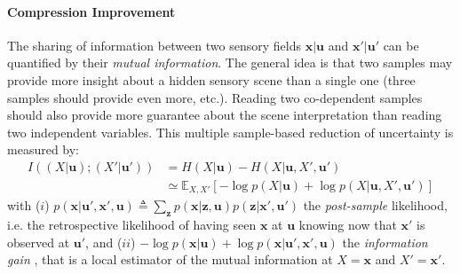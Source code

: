 \documentclass[12pt,twoside,openright]{article}
\begin{document}
\paragraph{Compression Improvement}
The sharing of information between two sensory fields $\boldsymbol{x}|\boldsymbol{u}$ and $\boldsymbol{x}'|\boldsymbol{u}'$  can be quantified by their \emph{mutual information}. The general idea is that two samples may provide more insight about a hidden sensory scene than a single one (three samples should provide even more, etc.). Reading two co-dependent samples should also provide more guarantee about the scene interpretation than reading two independent variables.  This multiple sample-based reduction of uncertainty is measured by:
\begin{align}
I((X| \boldsymbol{u}); (X'| \boldsymbol{u}')) &= H(X| \boldsymbol{u}) - H(X| \boldsymbol{u}, X', \boldsymbol{u}')\label{eq:info-gain}\\
&\simeq \mathbb{E}_{X,X'} \left[-\log p(X| \boldsymbol{u}) + \log p(X| \boldsymbol{u}, X', \boldsymbol{u}')\right] 
\end{align}
with 
($i$) $ p(\boldsymbol{x}| \boldsymbol{u}', \boldsymbol{x}', \boldsymbol{u}) \triangleq \sum_{\boldsymbol{z}} p(\boldsymbol{x}|\boldsymbol{z}, \boldsymbol{u}) p(\boldsymbol{z}|\boldsymbol{x}', \boldsymbol{u}')$ 
the \emph{post-sample} likelihood, i.e. the retrospective likelihood of having seen $\boldsymbol{x}$ at $\boldsymbol{u}$ knowing now that $\boldsymbol{x}'$ is observed at $\boldsymbol{u}'$,
and ($ii$) 
$-\log p(\boldsymbol{x}| \boldsymbol{u}) + \log p(\boldsymbol{x}| \boldsymbol{u}', \boldsymbol{x}', \boldsymbol{u})$ the 
\emph{information gain} \cite{tishby2011information}, that is a local estimator of the mutual information at $X = \boldsymbol{x}$ and $X' = \boldsymbol{x}'$.
\end{document}

